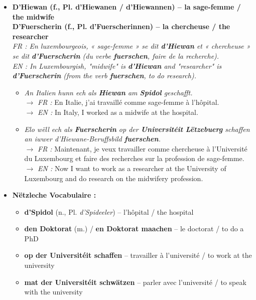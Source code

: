 \begin{itemize}
    \item \textbf{D'Hiewan (f., Pl. d'Hiewanen / d'Hiewannen) -- la sage-femme / the midwife} \\
    \textbf{D'Fuerscherin (f., Pl. d'Fuerscherinnen) -- la chercheuse / the researcher} \\
    \textit{FR : En luxembourgeois, « sage-femme » se dit \textbf{d'Hiewan} et « chercheuse » se dit \textbf{d'Fuerscherin} (du verbe \textbf{fuerschen}, faire de la recherche).} \\
    \textit{EN : In Luxembourgish, "midwife" is \textbf{d'Hiewan} and "researcher" is \textbf{d'Fuerscherin} (from the verb \textbf{fuerschen}, to do research).}
    \begin{itemize}
        \item \textit{An Italien hunn ech als \textbf{Hiewan} am \textbf{Spidol} geschafft.} \\
        $\rightarrow$ \textit{FR :} En Italie, j'ai travaillé comme sage-femme à l'hôpital. \\
        $\rightarrow$ \textit{EN :} In Italy, I worked as a midwife at the hospital.
        \item \textit{Elo wëll ech als \textbf{Fuerscherin} op der \textbf{Universitéit Lëtzebuerg} schaffen an iwwer d'Hiewane-Beruffsbild \textbf{fuerschen}.} \\
        $\rightarrow$ \textit{FR :} Maintenant, je veux travailler comme chercheuse à l'Université du Luxembourg et faire des recherches sur la profession de sage-femme. \\
        $\rightarrow$ \textit{EN :} Now I want to work as a researcher at the University of Luxembourg and do research on the midwifery profession.
    \end{itemize}

    \vspace{0.3em}

    \item \textbf{Nëtzleche Vocabulaire :}
    \begin{itemize}
        \item \textbf{d'Spidol} (n., Pl. \textit{d'Spideeler}) -- l'hôpital / the hospital
        \item \textbf{den Doktorat} (m.) / \textbf{en Doktorat maachen} -- le doctorat / to do a PhD
        \item \textbf{op der Universitéit schaffen} -- travailler à l'université / to work at the university
        \item \textbf{mat der Universitéit schwätzen} -- parler avec l'université / to speak with the university
    \end{itemize}
\end{itemize}

